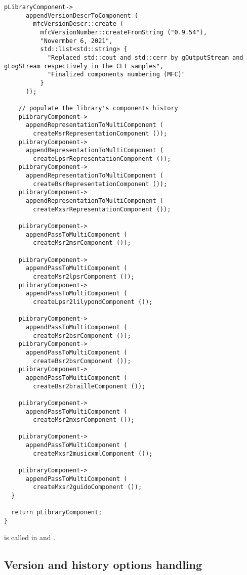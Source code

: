 \begin{lstlisting}[language=CPlusPlus]
    pLibraryComponent->
      appendVersionDescrToComponent (
        mfcVersionDescr::create (
          mfcVersionNumber::createFromString ("0.9.54"),
          "Novermber 6, 2021",
          std::list<std::string> {
            "Replaced std::cout and std::cerr by gOutputStream and gLogStream respectively in the CLI samples",
            "Finalized components numbering (MFC)"
          }
      ));

    // populate the library's components history
    pLibraryComponent->
      appendRepresentationToMultiComponent (
        createMsrRepresentationComponent ());
    pLibraryComponent->
      appendRepresentationToMultiComponent (
        createLpsrRepresentationComponent ());
    pLibraryComponent->
      appendRepresentationToMultiComponent (
        createBsrRepresentationComponent ());
    pLibraryComponent->
      appendRepresentationToMultiComponent (
        createMxsrRepresentationComponent ());

    pLibraryComponent->
      appendPassToMultiComponent (
        createMsr2msrComponent ());

    pLibraryComponent->
      appendPassToMultiComponent (
        createMsr2lpsrComponent ());
    pLibraryComponent->
      appendPassToMultiComponent (
        createLpsr2lilypondComponent ());

    pLibraryComponent->
      appendPassToMultiComponent (
        createMsr2bsrComponent ());
    pLibraryComponent->
      appendPassToMultiComponent (
        createBsr2bsrComponent ());
    pLibraryComponent->
      appendPassToMultiComponent (
        createBsr2brailleComponent ());

    pLibraryComponent->
      appendPassToMultiComponent (
        createMsr2mxsrComponent ());

    pLibraryComponent->
      appendPassToMultiComponent (
        createMxsr2musicxmlComponent ());

    pLibraryComponent->
      appendPassToMultiComponent (
        createMxsr2guidoComponent ());
  }

  return pLibraryComponent;
}
\end{lstlisting}

 is called in  and .


\subsection{Version and history options handling}\label{Version and history options handling}

